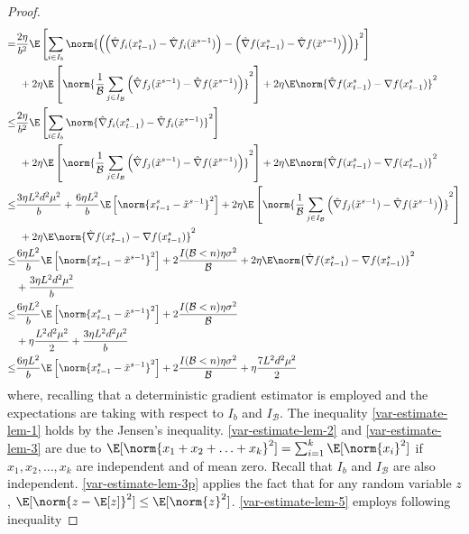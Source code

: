 \begin{proof}
\begin{align}
   = &\notag\frac{2\eta}{b^2}\E\left[\sum_{i\in I_b}\norm{\left(\left(\hat{\nabla} f_i(x_{t-1}^s)-\hat{\nabla} f_i(\tilde{x}^{s-1})\right) - \left({\hat{\nabla}} f(x_{t-1}^s) - \hat{\nabla} f(\tilde{x}^{s-1}) \right)\right)}^2\right]\\
   &\,\, \label{var-estimate-lem-3}+ 2\eta \E \left[ \norm{\frac{1}{\mathcal{B}}\sum_{j\in I_{\mathcal{B}}}\left(\hat{\nabla} f_j(\tilde{x}^{s-1}) - \hat{\nabla} f(\tilde{x}^{s-1})\right)}^2\right]+2\eta \E \norm{\hat{\nabla} f(x_{t-1}^s)-\nabla f(x_{t-1}^s)}^2\\
   \leq &\notag\frac{2\eta}{b^2}\E\left[\sum_{i\in I_b}\norm{\hat{\nabla} f_i(x_{t-1}^s)-\hat{\nabla} f_i(\tilde{x}^{s-1}) }^2\right]\\
   &\,\, \label{var-estimate-lem-3p}+ 2\eta \E \left[ \norm{\frac{1}{\mathcal{B}}\sum_{j\in I_{\mathcal{B}}}\left(\hat{\nabla} f_j(\tilde{x}^{s-1}) - \hat{\nabla} f(\tilde{x}^{s-1})\right)}^2\right]+2\eta \E \norm{\hat{\nabla} f(x_{t-1}^s)-\nabla f(x_{t-1}^s)}^2\\
   \leq  &\frac{3 \eta L^2 d^2 \mu^2}{b} + \frac{6\eta L^2}{b}\E\left[\norm{x_{t-1}^s-\tilde{x}^{s-1}}^2\right]+ 2\eta \E \left[ \norm{\frac{1}{\mathcal{B}}\sum_{j\in I_{\mathcal{B}}}\left(\hat{\nabla} f_j(\tilde{x}^{s-1}) - \hat{\nabla} f(\tilde{x}^{s-1})\right)}^2\right]\notag\\
   &\,\,\label{var-estimate-lem-5}+2\eta \E \norm{\hat{\nabla} f(x_{t-1}^s)-\nabla f(x_{t-1}^s)}^2\\
   \leq  &\frac{6\eta L^2}{b}\E\left[\norm{x_{t-1}^s-\tilde{x}^{s-1}}^2\right]+ 2\frac{I(\mathcal{B} < n)\eta \sigma ^2}{\mathcal{B}}+2\eta \E \norm{\hat{\nabla} f(x_{t-1}^s)-\nabla f(x_{t-1}^s)}^2\notag\\
   & \label{var-estimate-lem-6}+ \frac{3 \eta L^2 d^2 \mu^2}{b}\\
   \leq  &\label{var-estimate-lem-7}\frac{6\eta L^2}{b}\E\left[\norm{x_{t-1}^s-\tilde{x}^{s-1}}^2\right]+ 2\frac{I(\mathcal{B} < n)\eta \sigma ^2}{\mathcal{B}}\notag\\
   & +\eta \frac{L^2d^2\mu^2}{2}+ \frac{3 \eta L^2 d^2 \mu^2}{b}\\
   \leq  &\frac{6\eta L^2}{b}\E\left[\norm{x_{t-1}^s-\tilde{x}^{s-1}}^2\right]+ 2\frac{I(\mathcal{B} < n)\eta \sigma ^2}{\mathcal{B}}+\eta \frac{7L^2 d^2 \mu^2}{2} 
 \end{align}
 where, recalling that a deterministic gradient estimator is employed and the expectations are taking with respect to $I_b$ and $I_{\mathcal{B}}$. The inequality \eqref{var-estimate-lem-1} holds by the Jensen’s inequality. \eqref{var-estimate-lem-2} and \eqref{var-estimate-lem-3} are due to $\E[\norm{x_1+x_2+\ldots+x_k}^2] = \sum_{i=1}^k \E[\norm{x_i}^2]$ if $x_1,x_2,\ldots,x_k$ are independent and of mean zero. Recall that $I_b$ and $I_{\mathcal{B}}$ are also independent. \eqref{var-estimate-lem-3p} applies the fact that for any random variable $z$, $\E[\norm{z-\E[z]}^2] \leq \E[\norm{z}^2]$. \eqref{var-estimate-lem-5} employs following inequality  

\end{proof}
